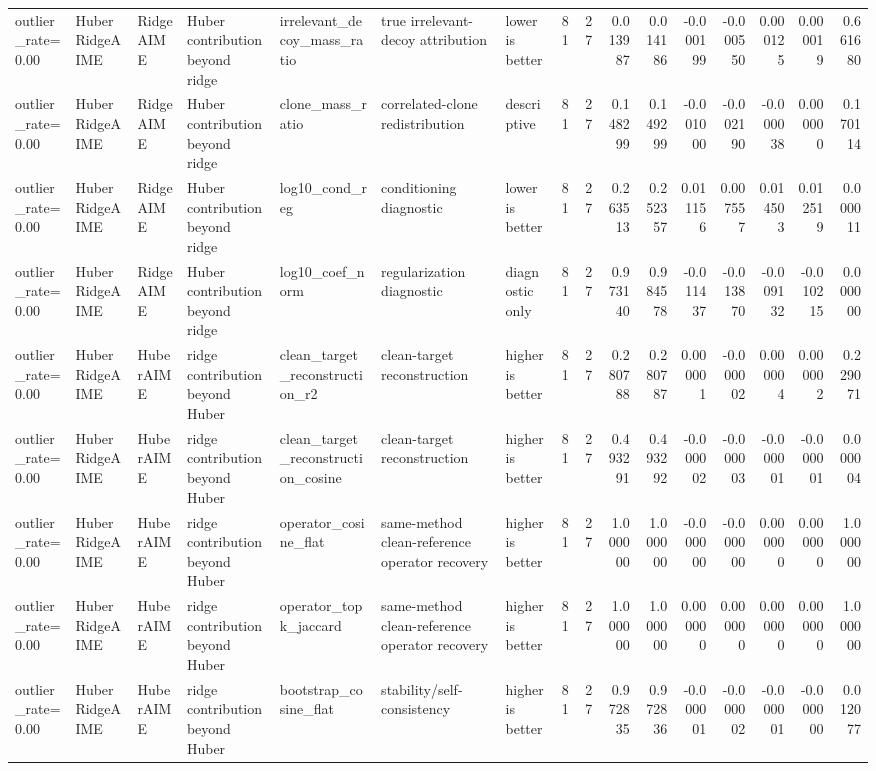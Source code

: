 \begin{table}[t]
\begin{tabular}{lllllllrrrrrrrrr}
outlier_rate=0.00 & HuberRidgeAIME & RidgeAIME & Huber contribution beyond ridge & irrelevant_decoy_mass_ratio & true irrelevant-decoy attribution & lower is better & 81 & 27 & 0.013987 & 0.014186 & -0.000199 & -0.000550 & 0.000125 & 0.000019 & 0.661680 \\
outlier_rate=0.00 & HuberRidgeAIME & RidgeAIME & Huber contribution beyond ridge & clone_mass_ratio & correlated-clone redistribution & descriptive & 81 & 27 & 0.148299 & 0.149299 & -0.001000 & -0.002190 & -0.000038 & 0.000000 & 0.170114 \\
outlier_rate=0.00 & HuberRidgeAIME & RidgeAIME & Huber contribution beyond ridge & log10_cond_reg & conditioning diagnostic & lower is better & 81 & 27 & 0.263513 & 0.252357 & 0.011156 & 0.007557 & 0.014503 & 0.012519 & 0.000011 \\
outlier_rate=0.00 & HuberRidgeAIME & RidgeAIME & Huber contribution beyond ridge & log10_coef_norm & regularization diagnostic & diagnostic only & 81 & 27 & 0.973140 & 0.984578 & -0.011437 & -0.013870 & -0.009132 & -0.010215 & 0.000000 \\
outlier_rate=0.00 & HuberRidgeAIME & HuberAIME & ridge contribution beyond Huber & clean_target_reconstruction_r2 & clean-target reconstruction & higher is better & 81 & 27 & 0.280788 & 0.280787 & 0.000001 & -0.000002 & 0.000004 & 0.000002 & 0.229071 \\
outlier_rate=0.00 & HuberRidgeAIME & HuberAIME & ridge contribution beyond Huber & clean_target_reconstruction_cosine & clean-target reconstruction & higher is better & 81 & 27 & 0.493291 & 0.493292 & -0.000002 & -0.000003 & -0.000001 & -0.000001 & 0.000004 \\
outlier_rate=0.00 & HuberRidgeAIME & HuberAIME & ridge contribution beyond Huber & operator_cosine_flat & same-method clean-reference operator recovery & higher is better & 81 & 27 & 1.000000 & 1.000000 & -0.000000 & -0.000000 & 0.000000 & 0.000000 & 1.000000 \\
outlier_rate=0.00 & HuberRidgeAIME & HuberAIME & ridge contribution beyond Huber & operator_topk_jaccard & same-method clean-reference operator recovery & higher is better & 81 & 27 & 1.000000 & 1.000000 & 0.000000 & 0.000000 & 0.000000 & 0.000000 & 1.000000 \\
outlier_rate=0.00 & HuberRidgeAIME & HuberAIME & ridge contribution beyond Huber & bootstrap_cosine_flat & stability/self-consistency & higher is better & 81 & 27 & 0.972835 & 0.972836 & -0.000001 & -0.000002 & -0.000001 & -0.000000 & 0.012077 \\

\end{tabular}
\end{table}

